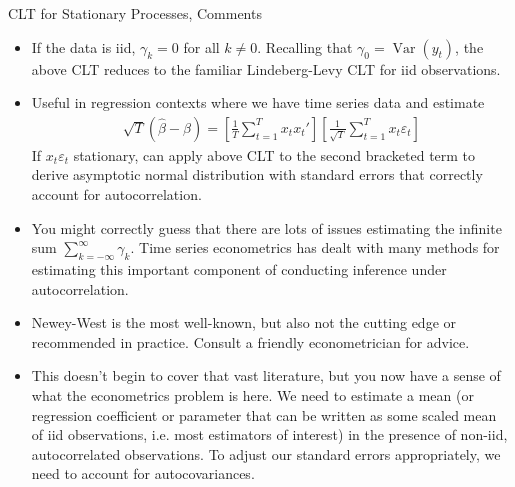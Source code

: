\documentclass[aspectratio=169, handout]{beamer}
\newcommand{\Var}{\operatorname{Var}}
\newcommand{\sumtT}{\sum^T_{t=1}}
\begin{document}
{\scriptsize
\begin{frame}{CLT for Stationary Processes, Comments}
\begin{itemize}
  \item If the data is iid, $\gamma_k=0$ for all $k\neq 0$.
    Recalling that $\gamma_0=\Var(y_t)$, the above CLT \alert{reduces}
    to the familiar \alert{Lindeberg-Levy} CLT for iid observations.
  \item Useful in \alert{regression} contexts where we have time series
    data and estimate
    \begin{align*}
      \sqrt{T}(\hat{\beta}-\beta)
      =
      \left[
        \frac{1}{T}
        \sumtT
        x_tx_t'
      \right]
      \left[
        \frac{1}{\sqrt{T}}
        \sumtT
        x_t\varepsilon_t
      \right]
    \end{align*}
    If $x_t\varepsilon_t$ stationary, can apply above CLT to the second
    bracketed term to derive asymptotic normal distribution with
    standard errors that correctly \alert{account for autocorrelation}.

  \item You might correctly guess that there are lots of \alert{issues}
    estimating the infinite sum $\sum_{k=-\infty}^\infty \gamma_k$.
    Time series econometrics has dealt with many methods for estimating
    this important component of conducting inference under
    autocorrelation.

  \item \alert{Newey-West} is the most well-known, but also not the
    cutting edge or recommended in practice.
    Consult a friendly econometrician for advice.

  \item This doesn't begin to cover that vast literature, but you now
    have a sense of what the econometrics problem is here.
    We need to estimate a mean (or regression coefficient or parameter
    that can be written as some scaled mean of iid observations, i.e.
    most estimators of interest) in the presence of non-iid,
    autocorrelated observations.
    To adjust our standard errors appropriately, we need to account for
    autocovariances.
\end{itemize}
\end{frame}
}


\end{document}

